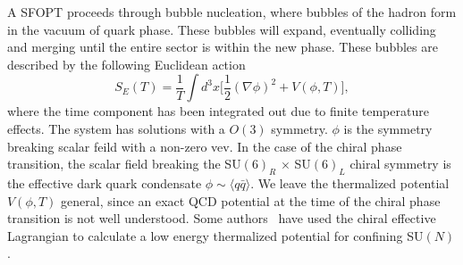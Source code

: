 \documentclass[nofootinbib,twocolumn,preprintnumbers]{revtex4-1}
\begin{document}
A SFOPT proceeds through bubble nucleation, where bubbles of the hadron form in the vacuum of quark phase. These bubbles will expand, eventually colliding and merging until the entire sector is within the new phase.  These bubbles are described by the following Euclidean action~\cite{}
%
\begin{equation}\label{eqn:EuclideanAction}
S_{E}(T) = \frac{1}{T}\int d^3x \bigg[\frac{1}{2}(\nabla\phi)^2 + V(\phi,T)  \bigg],
\end{equation}
where the time component has been integrated out due to finite temperature effects. The system has solutions with a $O(3)$ symmetry. $\phi$ is the symmetry breaking scalar feild with a non-zero vev. In the case of the chiral phase transition, the scalar field breaking the SU$(6)_{R}$ $ \times$ SU$(6)_{L}$ chiral symmetry is the effective dark quark condensate $\phi \sim \langle q\bar{q} \rangle$. We leave the thermalized potential $V(\phi, T)$ general, since an exact QCD potential at the time of the chiral phase transition is not well understood. Some authors~\cite{} have used the chiral effective Lagrangian to calculate a low energy thermalized potential for confining SU$(N)$ .
\end{document}
